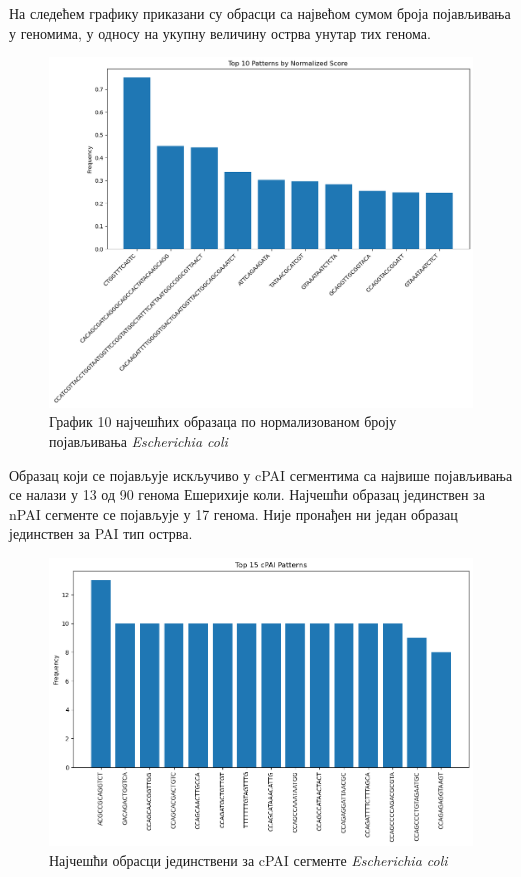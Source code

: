 \documentclass[12pt]{article}
\begin{document}
\newpage

На следећем графику приказани су обрасци са највећом сумом броја појављивања у геномима, у односу на укупну величину острва унутар тих генома.

\begin{figure}[htbp]
    \centering
    \vspace{0.3cm}
    \includegraphics[width=\linewidth]{images/e_coli/top10_normalized.png}
    \caption{График 10 најчешћих образаца по нормализованом броју појављивања \textit{Escherichia coli}}
    \vspace{0.5cm}
    \label{fig:top10hist}
\end{figure}

Образац који се појављује искључиво у cPAI сегментима са највише појављивања се налази у 13 од 90 генома Ешерихије коли. Најчешћи образац јединствен за nPAI сегменте се појављује у 17 генома.  Није пронађен ни један образац јединствен за PAI тип острва.

\begin{figure}[htbp]
    \centering
    \includegraphics[width=0.8\linewidth]{images/e_coli/top15_cpai.png}
    \caption{Најчешћи обрасци јединствени за cPAI сегменте \textit{Escherichia coli}}
    \label{fig:top15_cpai}
\end{figure}
\end{document}
